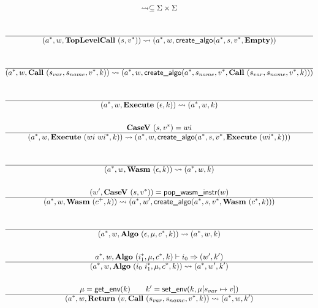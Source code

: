 
\begin{gather*}
\leadsto \subseteq \Sigma \times \Sigma \\
%
\newline \\
  \\
  \hline
  (\seq{a}, w, \toplevelcall ~ (s, \seq v)) \leadsto (\seq{a}, w, \createalgo(\seq a, s, \seq v, \mt)) \\
%
\newline \\
  \\
  \hline
  (\seq{a}, w, \call ~ (s_{var}, s_{name}, \seq v, k)) \leadsto
  (\seq{a}, w, \createalgo(\seq a, s_{name}, \seq v, \call ~ (s_{var}, s_{name}, \seq v, k))) \\
%
\newline \\
  \\
  \hline
  (\seq{a}, w, \exe ~ (\epsilon, k)) \leadsto (\seq{a}, w, k) \\
%
\newline \\
  \casev ~ (s, \seq v) = wi \\
  \hline
  (\seq{a}, w, \exe ~ (wi ~ \seq{wi}, k)) \leadsto
  (\seq{a}, w, \createalgo(\seq a, s, \seq v, \exe ~ (\seq{wi}, k))) \\
%
\newline \\
  \\
  \hline
  (\seq{a}, w, \wasm ~ (\epsilon, k)) \leadsto (\seq{a}, w, k) \\
%
\newline \\
  (w', \casev ~ (s, \seq v)) = \popwasminstr(w) \\
  \hline
  (\seq{a}, w, \wasm ~ (c^+, k))
  \leadsto
  (\seq{a}, w', \createalgo(\seq a, s, \seq v, \wasm ~ (\seq c, k))) \\
%
\newline \\
  \\
  \hline
  (\seq{a}, w, \algo ~ (\epsilon, \mu, \seq c, k)) \leadsto (\seq{a}, w, k) \\
%
\newline \\
  \seq{a}, w, \algo ~ (\seq{i_1}, \mu, \seq c, k) \vdash i_0 \Rightarrow (w', k') \\
  \hline
  (\seq{a}, w, \algo ~ (i_0 ~ \seq{i_1}, \mu, \seq c, k)) \leadsto (\seq{a}, w', k') \\
%
\newline \\
  \mu = \getenv(k) \qquad k' = \setenv(k, \mu[s_{var} \mapsto v]) \\
  \hline
  (\seq{a}, w, \ret ~ (v, \call ~ (s_{var}, s_{name}, \seq v, k)) \leadsto (\seq a, w, k') \\
\end{gather*}

